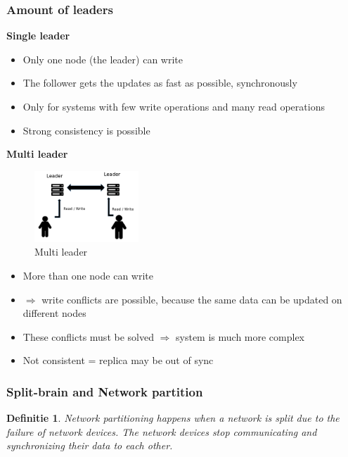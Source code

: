 \documentclass{article}
\newtheorem{theorem}{Definitie}[section]
\begin{document}
\subsubsection{Amount of leaders}

\textbf{Single leader}

\begin{itemize}
    \item Only one node (the leader) can write
    \item The follower gets the updates as fast as possible, synchronously
    \item Only for systems with few write operations and many read operations
    \item Strong consistency is possible
\end{itemize}

\textbf{Multi leader}
\begin{figure}[H]
    \centering
    \includegraphics[width=0.35\textwidth]{replication-multi-leader.png}
    \caption{Multi leader}
\end{figure}

\begin{itemize}
    \item More than one node can write
    \item $\Rightarrow$ write conflicts are possible, because the same data can be updated on different nodes
    \item These conflicts must be solved $\Rightarrow$ system is much more complex
    \item Not consistent = replica may be out of sync
\end{itemize}

\subsubsection{Split-brain and Network partition}

\begin{theorem}
    Network partitioning happens when a network is split due to the failure of network devices.
    The network devices stop communicating and synchronizing their data to each other.
\end{theorem}
\end{document}
